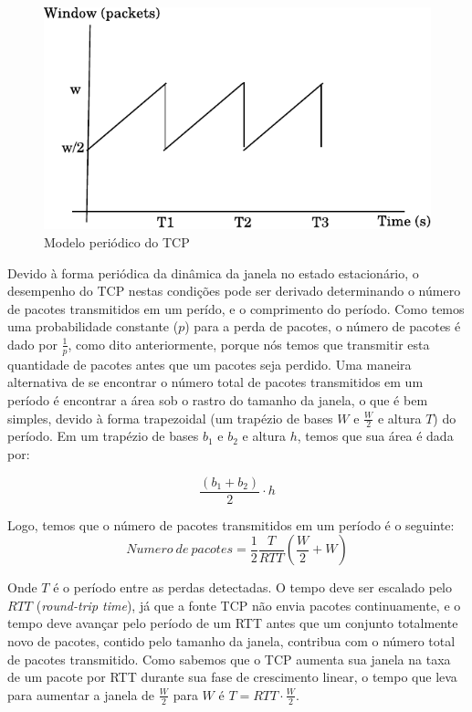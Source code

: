 \begin{figure}
\label{serra}
\centering
\includegraphics{figs/periodic_model.pdf}
\caption{Modelo periódico do TCP}
\end{figure}

Devido à forma periódica da dinâmica da janela no estado estacionário, o
desempenho do TCP nestas condições pode ser derivado determinando o número de
pacotes transmitidos em um perído, e o comprimento do período. Como temos uma
probabilidade constante ($p$) para a perda de pacotes, o número de pacotes é
dado por $\frac{1}{p}$, como dito anteriormente, porque nós temos que transmitir
esta quantidade de pacotes antes que um pacotes seja perdido. Uma maneira
alternativa de se encontrar o número total de pacotes transmitidos em um período
é encontrar a área sob o rastro do tamanho da janela, o que é bem simples,
devido à forma trapezoidal (um trapézio de bases $W$  e $\frac{W}{2}$  e
altura $T$) do período. Em um trapézio de bases $b_1$ e $b_2$ e altura $h$,
temos que sua área é dada por:

$$\frac{(b_1 + b_2)}{2}\cdot h$$

Logo, temos que o número de pacotes transmitidos em um período é o seguinte:
\begin{equation}
\label{npkt}
Numero\ de\ pacotes = \frac{1}{2}\frac{T}{RTT}\left(\frac{W}{2} + W\right)
\end{equation}

Onde $T$ é o período entre as perdas detectadas. O tempo deve ser escalado pelo
$RTT$ (\textit{round-trip time}), já que a fonte TCP não envia pacotes
continuamente, e o tempo deve avançar pelo período de um RTT antes que um
conjunto totalmente novo de pacotes, contido pelo tamanho da janela, contribua
com o número total de pacotes transmitido. Como sabemos que o TCP aumenta sua
janela na taxa de um pacote por RTT durante sua fase de crescimento linear, o
tempo que leva para aumentar a janela de $\frac{W}{2}$ para $W$ é $T =
RTT \cdot \frac{W}{2}$. 

